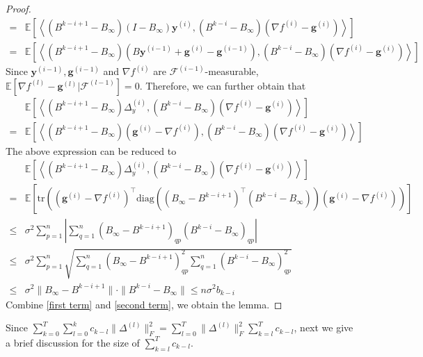 \documentclass{article}
\newcommand{\vg}{{\mathbf{g}}}
\newcommand{\vy}{{\mathbf{y}}}
\newcommand{\cF}{{\mathcal{F}}}
\newcommand{\EE}[1]{\mathbb{E}\left[#1\right]}
\newcommand{\norm}[1]{\| #1 \|}
\newcommand{\ip}[1]{\left\langle#1\right\rangle}
\begin{document}
\begin{proof}
\begin{align*}
=&\EE{\ip{(B^{k-i+1}-B_{\infty})(I-B_{\infty})\vy^{(i)},(B^{k-i}-B_{\infty})(\nabla f^{(i)}-\vg^{(i)})}}\\ 
=&\EE{\ip{(B^{k-i+1}-B_{\infty})(B\vy^{(i-1)}+\vg^{(i)}-\vg^{(i-1)}),(B^{k-i}-B_{\infty})(\nabla f^{(i)}-\vg^{(i)})}}
\end{align*}
Since $\vy^{(i-1)}, \vg^{(i-1)}$ and $\nabla f^{(i)}$ are $\cF^{(i-1)}$-measurable, $\EE{\nabla f^{(l)}-\vg^{(l)}|\cF^{(l-1)}}=0$. Therefore, we can further obtain that 
\begin{align*}
  &\EE{\ip{(B^{k-i+1}-B_{\infty})\Delta_y^{(i)},(B^{k-i}-B_{\infty})(\nabla f^{(i)}-\vg^{(i)})}}\\ 
=&\EE{\ip{(B^{k-i+1}-B_{\infty})(\vg^{(i)}-\nabla f^{(i)}),(B^{k-i}-B_{\infty})(\nabla f^{(i)}-\vg^{(i)})}}
\end{align*}
The above expression can be reduced to 
\begin{align}
&\EE{\ip{(B^{k-i+1}-B_{\infty})\Delta_y^{(i)},(B^{k-i}-B_{\infty})(\nabla f^{(i)}-\vg^{(i)})}}\nonumber\\ 
=& \EE{\mathrm{tr}\left((\vg^{(i)}-\nabla f^{(i)})^\top\mathrm{diag}((B_\infty-B^{k-i+1})^\top(B^{k-i}-B_\infty))(\vg^{(i)}-\nabla f^{(i)})\right)}\nonumber\\ 
\leq &\sigma^2\sum_{p=1}^n\left\lvert\sum_{q=1}^n(B_\infty-B^{k-i+1})_{qp}(B^{k-i}-B_\infty)_{qp}\right\rvert\nonumber\\
\leq&\sigma^2\sum_{p=1}^n\sqrt{\sum_{q=1}^n(B_\infty-B^{k-i+1})_{qp}^2\sum_{q=1}^n(B^{k-i}-B_\infty)_{qp}^2}\nonumber\\
\leq&\sigma^2\norm{B_\infty-B^{k-i+1}}\cdot\norm{B^{k-i}-B_\infty} \le n\sigma^2b_{k-i}\label{second term}
\end{align}
Combine \ref{first term} and \ref{second term}, we obtain the lemma.
\end{proof}

Since $\sum_{k=0}^T\sum_{l=0}^k c_{k-l}\norm{\Delta^{(l)}}_F^2=\sum_{l=0}^T\norm{\Delta^{(l)}}_F^2\sum_{k=l}^Tc_{k-l}$, next we give a brief discussion for the size of $\sum_{k=l}^T c_{k-l}$.
\end{document}
